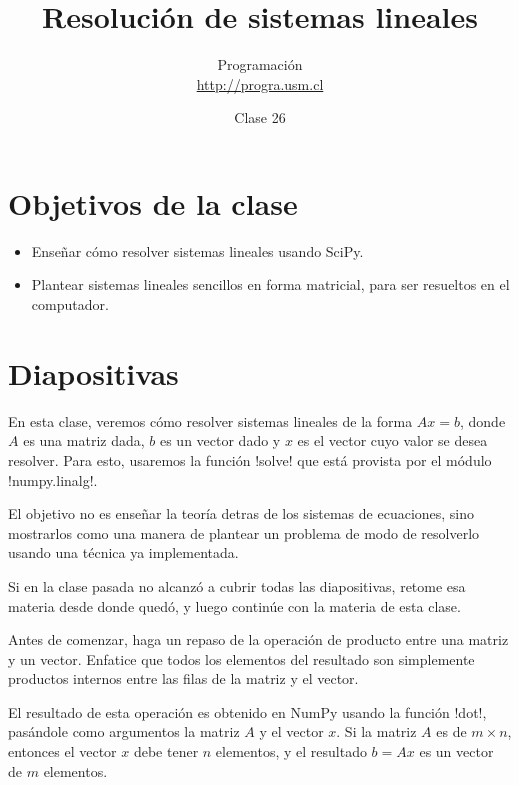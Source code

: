 \documentclass[10pt]{article}
\title{Resolución de sistemas lineales}
\author{Programación \\ \url{http://progra.usm.cl}}
\date{Clase 26}
\begin{document}
  \maketitle

  \section*{Objetivos de la clase}
  \begin{itemize}
    \item Enseñar cómo resolver sistemas lineales usando SciPy.
    \item Plantear sistemas lineales sencillos
      en forma matricial, para ser resueltos en el computador.
  \end{itemize}

  \section*{Diapositivas}

  En esta clase,
  veremos cómo resolver sistemas lineales
  de la forma \(Ax = b\),
  donde \(A\) es una matriz dada,
  \(b\) es un vector dado
  y \(x\) es el vector cuyo valor se desea resolver.
  Para esto, usaremos la función \li!solve!
  que está provista por el módulo \li!numpy.linalg!.

  El objetivo no es enseñar la teoría detras de los sistemas de ecuaciones,
  sino mostrarlos como una manera de plantear un problema
  de modo de resolverlo usando una técnica ya implementada.

  Si en la clase pasada no alcanzó a cubrir todas las diapositivas,
  retome esa materia desde donde quedó,
  y luego continúe con la materia de esta clase.


  Antes de comenzar, haga un repaso de la operación
  de producto entre una matriz y un vector.
  Enfatice que todos los elementos del resultado
  son simplemente productos internos entre las filas de la matriz
  y el vector.

  El resultado de esta operación
  es obtenido en NumPy usando la función \li!dot!,
  pasándole como argumentos la matriz \(A\) y el vector \(x\).
  Si la matriz \(A\) es de \(m\times n\),
  entonces el vector \(x\) debe tener \(n\) elementos,
  y el resultado \(b = Ax\) es un vector de \(m\) elementos.

\end{document}
